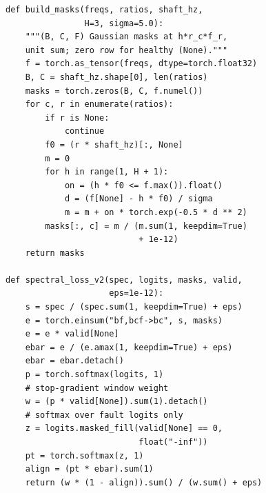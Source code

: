 \documentclass[conference]{IEEEtran}
\begin{document}
\begin{lstlisting}[caption={Per-window masks and the revised term $L_{\mathrm{spec}}^{\mathrm{v2}}$ (Eq.~\eqref{eq:v2}).},label={lst:loss}]
def build_masks(freqs, ratios, shaft_hz,
                H=3, sigma=5.0):
    """(B, C, F) Gaussian masks at h*r_c*f_r,
    unit sum; zero row for healthy (None)."""
    f = torch.as_tensor(freqs, dtype=torch.float32)
    B, C = shaft_hz.shape[0], len(ratios)
    masks = torch.zeros(B, C, f.numel())
    for c, r in enumerate(ratios):
        if r is None:
            continue
        f0 = (r * shaft_hz)[:, None]
        m = 0
        for h in range(1, H + 1):
            on = (h * f0 <= f.max()).float()
            d = (f[None] - h * f0) / sigma
            m = m + on * torch.exp(-0.5 * d ** 2)
        masks[:, c] = m / (m.sum(1, keepdim=True)
                           + 1e-12)
    return masks

def spectral_loss_v2(spec, logits, masks, valid,
                     eps=1e-12):
    s = spec / (spec.sum(1, keepdim=True) + eps)
    e = torch.einsum("bf,bcf->bc", s, masks)
    e = e * valid[None]
    ebar = e / (e.amax(1, keepdim=True) + eps)
    ebar = ebar.detach()
    p = torch.softmax(logits, 1)
    # stop-gradient window weight
    w = (p * valid[None]).sum(1).detach()
    # softmax over fault logits only
    z = logits.masked_fill(valid[None] == 0,
                           float("-inf"))
    pt = torch.softmax(z, 1)
    align = (pt * ebar).sum(1)
    return (w * (1 - align)).sum() / (w.sum() + eps)
\end{lstlisting}
\end{document}
